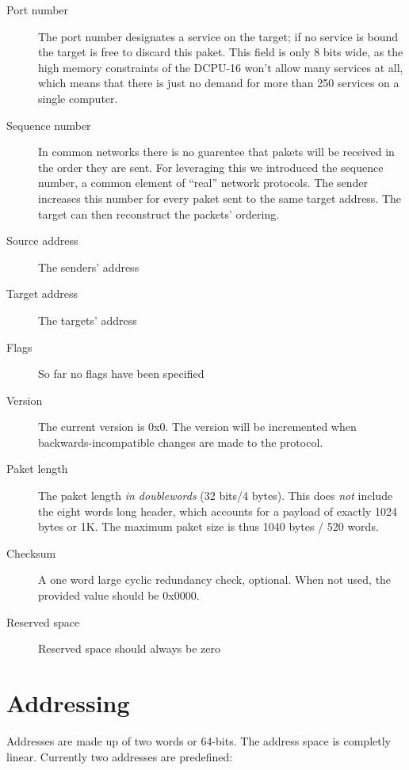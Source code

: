 \documentclass[12pt,a4paper,english,DIV=15,oneside,parskip=half]{scrartcl}
\begin{document}
\begin{description}
\item[Port number] The port number designates a service on the target; if no service is bound the target is free to discard this paket. This field is only 8 bits wide, as the high memory constraints of the DCPU-16 won\rq{}t allow many services at all, which means that there is just no demand for more than 250 services on a single computer.

\item[Sequence number] In common networks there is no guarentee that pakets will be received in the order they are sent. For leveraging this we introduced the sequence number, a common element of \enquote{real} network protocols. The sender increases this number for every paket sent to the same target address. The target can then reconstruct the packets\rq{} ordering.

\item[Source address] The senders\rq{} address

\item[Target address] The targets\rq{} address

\item[Flags] So far no flags have been specified

\item[Version] The current version is 0x0. The version will be incremented when backwards-incompatible changes are made to the protocol.

\item[Paket length] The paket length \emph{in doublewords} (32 bits/4 bytes). This does \emph{not} include the eight words long header, which accounts for a payload of exactly 1024 bytes or 1K. The maximum paket size is thus 1040 bytes / 520 words.

\item[Checksum] A one word large cyclic redundancy check, optional. When not used, the provided value should be 0x0000.

\item[Reserved space] Reserved space should always be zero
\end{description}

\section{Addressing}

Addresses are made up of two words or 64-bits. The address space is completly linear. Currently two addresses are predefined:
\end{document}
